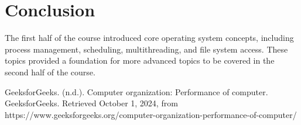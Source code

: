 \documentclass[12pt]{article}
\begin{document}
\section{Conclusion}
The first half of the course introduced core operating system concepts, including process management, scheduling, multithreading, and file system access. These topics provided a foundation for more advanced topics to be covered in the second half of the course.

\begin{thebibliography}{9}
    GeeksforGeeks. (n.d.). Computer organization: Performance of computer. GeeksforGeeks. Retrieved October 1, 2024, from https://www.geeksforgeeks.org/computer-organization-performance-of-computer/
    \end{thebibliography}
\end{document}
